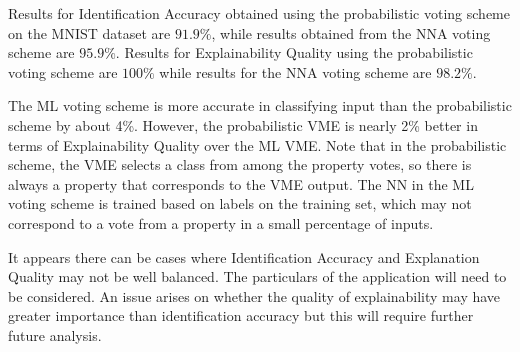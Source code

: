 \documentclass[conference]{IEEEtran}
\begin{document}
Results for Identification Accuracy obtained using the probabilistic voting
scheme on the MNIST dataset are $91.9\%$, while results obtained from the NNA
voting scheme are $95.9\%$.  Results for Explainability Quality using the
probabilistic voting scheme are $100\%$ while results for the NNA voting scheme
are $98.2\%$.

The ML voting scheme is more accurate in classifying input than the
probabilistic scheme by about 4\%.   However, the probabilistic VME is nearly
2\% better in terms of Explainability Quality over the ML VME.  Note that in the
probabilistic scheme, the VME selects a class from among the property votes, so
there is always a property that corresponds to the VME output.  The NN in the ML
voting scheme is trained based on labels on the training set, which may not
correspond to a vote from a property in a small percentage of inputs.

It appears there can be cases where Identification Accuracy and Explanation
Quality may not be well balanced.  The particulars of the application will need
to be considered.  An issue arises on whether the quality of explainability may
have greater importance than identification accuracy but this will require
further future analysis.


{}
\end{document}
